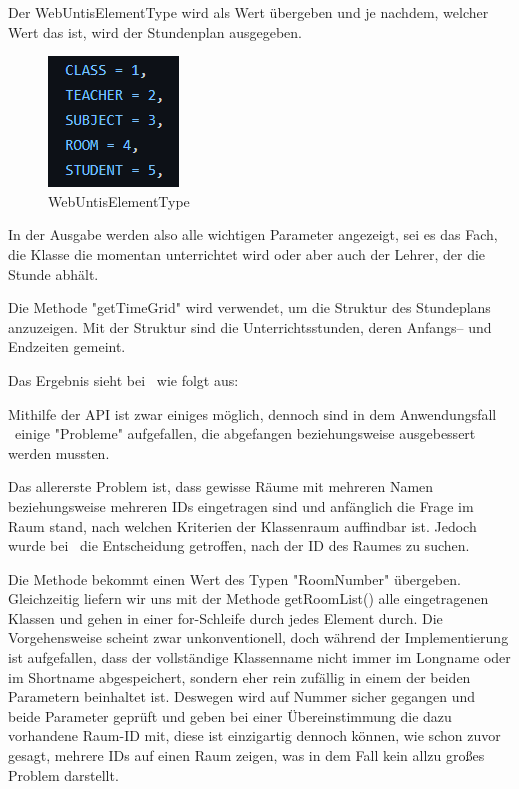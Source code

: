 
Der WebUntisElementType wird als Wert übergeben und je nachdem, welcher Wert das ist, wird der Stundenplan ausgegeben. 

\begin{figure}[H]
    \centering
    \includegraphics{media/WebUntis/WebUntisElementType.png}
    \caption{WebUntisElementType}
\end{figure}


In der Ausgabe werden also alle wichtigen Parameter angezeigt, sei es das Fach, die Klasse die momentan unterrichtet wird oder aber auch der Lehrer, der die Stunde abhält.


Die Methode "getTimeGrid" wird verwendet, um die Struktur des Stundeplans anzuzeigen. Mit der Struktur sind die Unterrichtsstunden, deren Anfangs– und Endzeiten gemeint.


Das Ergebnis sieht bei \ZELIA\ wie folgt aus:



Mithilfe der API ist zwar einiges möglich, dennoch sind in dem Anwendungsfall \ZELIA\ einige "Probleme" aufgefallen, die abgefangen beziehungsweise ausgebessert werden mussten.

Das allererste Problem ist, dass gewisse Räume mit mehreren Namen beziehungsweise mehreren IDs eingetragen sind und anfänglich die Frage im Raum stand, nach welchen Kriterien der Klassenraum auffindbar ist. Jedoch wurde bei \ZELIA\ die Entscheidung getroffen, nach der ID des Raumes zu suchen.



Die Methode bekommt einen Wert des Typen "RoomNumber" übergeben. Gleichzeitig liefern wir uns mit der Methode getRoomList() alle eingetragenen Klassen und gehen in einer for-Schleife durch jedes Element durch. Die Vorgehensweise scheint zwar unkonventionell, doch während der Implementierung ist aufgefallen, dass der vollständige Klassenname nicht immer im Longname oder im Shortname abgespeichert, sondern eher rein zufällig in einem der beiden Parametern beinhaltet ist. Deswegen wird auf Nummer sicher gegangen und beide Parameter geprüft und geben bei einer Übereinstimmung die dazu vorhandene Raum-ID mit, diese ist einzigartig dennoch können, wie schon zuvor gesagt, mehrere IDs auf einen Raum zeigen, was in dem Fall kein allzu großes Problem darstellt.

